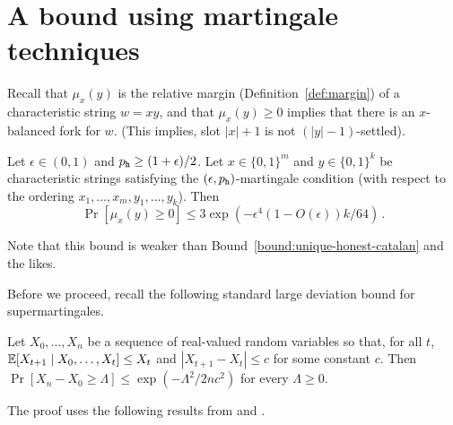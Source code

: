 \section{A bound using martingale techniques}\label{sec:martingale-proof}

Recall that $\mu_x(y)$ is the relative margin (Definition~\ref{def:margin}) 
of a characteristic string $w = xy$, 
and that $\mu_x(y) \geq 0$ implies that there is an $x$-balanced fork for $w$. 
(This implies, slot $|x|+1$ is not $(|y|-1)$-settled).
\begin{bound}\label{bound:martingale}
  Let $\epsilon \in (0,1)$ and $p_{\mathtt{h}} \geq (1+\epsilon)/2$. 
  Let $x \in \{0,1\}^m$ and $y \in \{0,1\}^k$ be characteristic strings 
  satisfying the $(\epsilon, p_{\mathtt{h}})$-martingale condition (with respect to the ordering $x_1, \ldots, x_m, y_1, \ldots, y_k$). 
  Then
  \[
    \Pr[\mu_x(y) \geq 0] \leq
    3 \exp\left( -\epsilon^4 (1 - O(\epsilon) ) k/64 \right)  
    \, .
  \]
\end{bound}
Note that this bound is weaker than Bound~\ref{bound:unique-honest-catalan} and the likes.

Before we proceed, recall 
the following standard large deviation bound for supermartingales.
\begin{theorem}\label{thm:azuma}
  Let $X_0, \ldots, X_n$ be a sequence of real-valued random variables
  so that, for all $t$,
  $\operatorname{\mathbb{E}}[X_{t+1} \mid X_0, \ldots, X_{t}] \leq X_t$ and
  $|X_{t+1} - X_t| \leq c$ for some constant $c$. Then  
  $
    \Pr[X_n - X_0 \geq \Lambda] \leq
    \exp\left(-{\Lambda^2}/{2nc^2}\right)
  $ 
  for every $\Lambda \geq 0$.
\end{theorem}

The proof uses the following results from \citet{Ouroboros} and \citet{LinearConsistencySODA}.


